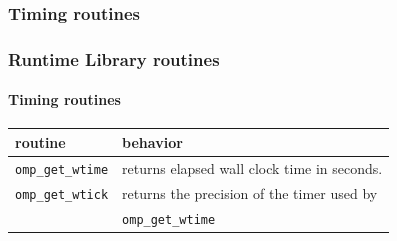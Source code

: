 %
%
%
%


\subsubsection{Timing routines}

\begin{frame}
\frametitle{Runtime Library routines}
\framesubtitle{Timing routines}

\begin{center}
\begin{tabular}{|l|l|}
\hline
  \textbf{routine} & \textbf{behavior}  \\
\hline
\hline
\texttt{omp\_get\_wtime} &
returns elapsed wall clock time in seconds. \\
\hline
\texttt{omp\_get\_wtick} &
returns the precision of the timer used by \\
& \texttt{omp\_get\_wtime} \\
\hline
\end{tabular}
\end{center}

\end{frame}





